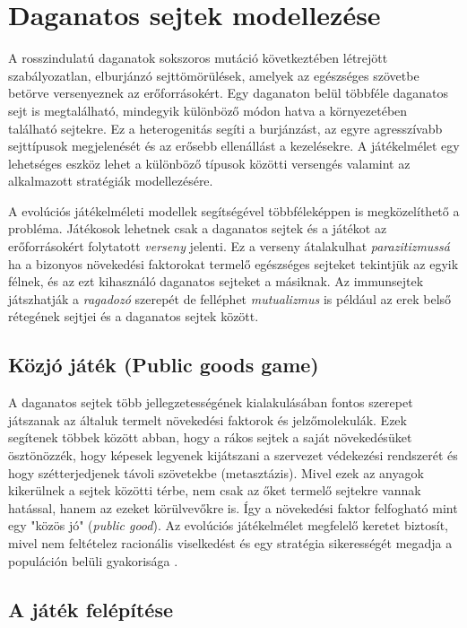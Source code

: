 \chapter{Daganatos sejtek modellezése}
A rosszindulatú daganatok sokszoros mutáció következtében létrejött szabályozatlan, elburjánzó sejttömörülések, amelyek az egészséges szövetbe betörve versenyeznek az erőforrásokért. Egy daganaton belül többféle daganatos sejt is megtalálható, mindegyik különböző módon hatva a környezetében található sejtekre. Ez a heterogenitás segíti a burjánzást, az egyre agresszívabb sejttípusok megjelenését és az erősebb ellenállást a kezelésekre. A játékelmélet egy lehetséges eszköz lehet a különböző típusok közötti versengés valamint az alkalmazott stratégiák modellezésére.

A evolúciós játékelméleti modellek segítségével többféleképpen is megközelíthető a probléma. Játékosok lehetnek csak a daganatos sejtek és a játékot az erőforrásokért folytatott \textit{verseny} jelenti. Ez a verseny átalakulhat \textit{parazitizmussá} ha a bizonyos növekedési faktorokat termelő egészséges sejteket tekintjük az egyik félnek, és az ezt kihasználó daganatos sejteket a másiknak. Az immunsejtek játszhatják a \textit{ragadozó} szerepét de felléphet \textit{mutualizmus} is például az erek belső rétegének sejtjei és a daganatos sejtek között. 

\section{Közjó játék (Public goods game)}
A daganatos sejtek több jellegzetességének kialakulásában fontos szerepet játszanak az általuk termelt növekedési faktorok és jelzőmolekulák. Ezek segítenek többek között abban, hogy a rákos sejtek a saját növekedésüket ösztönözzék, hogy képesek legyenek kijátszani a szervezet védekezési rendszerét és hogy szétterjedjenek távoli szövetekbe (metasztázis). Mivel ezek az anyagok kikerülnek a sejtek közötti térbe, nem csak az őket termelő sejtekre vannak hatással, hanem az ezeket körülvevőkre is. Így a növekedési faktor felfogható mint egy "közös jó" (\textit{public good}). Az evolúciós játékelmélet megfelelő keretet biztosít, mivel nem feltételez racionális viselkedést és egy stratégia sikerességét megadja a populáción belüli gyakorisága \cite{archetti2016cooperation}.

\section{A játék felépítése}
